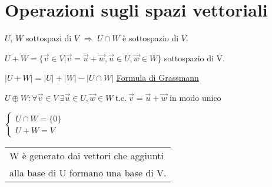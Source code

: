\section{Operazioni sugli spazi vettoriali}
$U$, $W$ sottospazi di $V$ $\Rightarrow$ $U \cap W$ è sottospazio di $V$.

$U+W = \{\vec{v} \in V | \vec{v} = \vec{u} + \vec{w}, \vec{u} \in U, \vec{w} \in W\}$ sottospazio di V.

$|U+W| = |U| + |W| - |U \cap W|$ \underline{Formula di Grassmann}

\vspace{0.6em}

$U \oplus W: \forall \vec{v} \in V\ \exists \vec{u} \in U, \vec{w} \in W\ \text{t.c.}\ \vec{v} = \vec{u} + \vec{w}$ in modo unico

\(
\begin{cases}
U \cap W = \{0\} \\[0em]
U + W = V
\end{cases}
\)
\begin{tabular}{@{}l@{}}
	W è generato dai vettori che aggiunti \\ alla base di U formano una base di V.
\end{tabular}